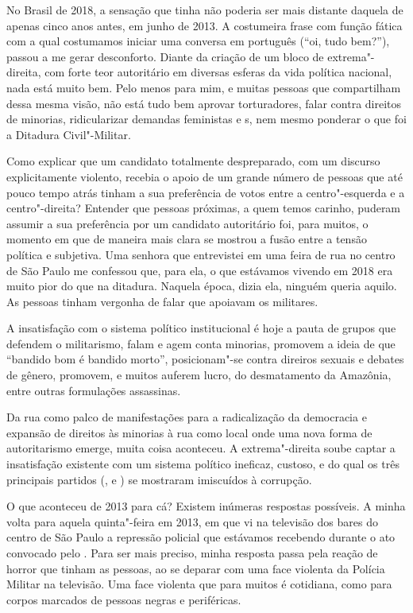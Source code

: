 No Brasil de 2018, a sensação que tinha não poderia ser mais distante
daquela de apenas cinco anos antes, em junho de 2013. A costumeira frase
com função fática com a qual costumamos iniciar uma conversa em
português (``oi, tudo bem?''), passou a me gerar desconforto. Diante da
criação de um bloco de extrema"-direita, com forte teor autoritário em
diversas esferas da vida política nacional, nada está muito bem. Pelo
menos para mim, e muitas pessoas que compartilham dessa mesma visão, não
está tudo bem aprovar torturadores, falar contra direitos de minorias,
ridicularizar demandas feministas e s, nem mesmo ponderar o que
foi a Ditadura Civil"-Militar.

Como explicar que um candidato totalmente despreparado, com um discurso
explicitamente violento, recebia o apoio de um grande número de pessoas
que até pouco tempo atrás tinham a sua preferência de votos entre a
centro"-esquerda e a centro"-direita? Entender que pessoas próximas, a
quem temos carinho, puderam assumir a sua preferência por um candidato
autoritário foi, para muitos, o momento em que de maneira mais clara se
mostrou a fusão entre a tensão política e subjetiva. Uma
senhora que entrevistei em uma feira de rua no centro de São Paulo
me confessou que, para ela, o
que estávamos vivendo em 2018 era muito pior do que na ditadura. Naquela
época, dizia ela, ninguém queria aquilo. As pessoas tinham vergonha de
falar que apoiavam os militares.

A insatisfação com o sistema político institucional é hoje a pauta de grupos que defendem o militarismo, falam e agem conta minorias, promovem a ideia de que ``bandido bom é bandido morto'', posicionam"-se contra direiros sexuais e debates de gênero, promovem, e muitos auferem lucro, do desmatamento da Amazônia, entre outras formulações assassinas.

Da rua como palco de manifestações para a radicalização da
democracia e expansão de direitos às minorias à rua como local onde uma
nova forma de autoritarismo emerge, muita coisa aconteceu. A
extrema"-direita soube captar a insatisfação existente com um sistema
político ineficaz, custoso, e do qual os três principais partidos (,
 e ) se mostraram imiscuídos à corrupção.

O que aconteceu de 2013 para cá? Existem inúmeras respostas possíveis. A
minha volta para aquela quinta"-feira em 2013, em que vi na televisão dos
bares do centro de São Paulo a repressão policial que estávamos recebendo
durante o ato convocado pelo . Para ser mais preciso, minha resposta
passa pela reação de horror que tinham as pessoas, ao se deparar com uma
face violenta da Polícia Militar na televisão. Uma face violenta que
para muitos é cotidiana, como para corpos marcados de pessoas
negras e periféricas.

